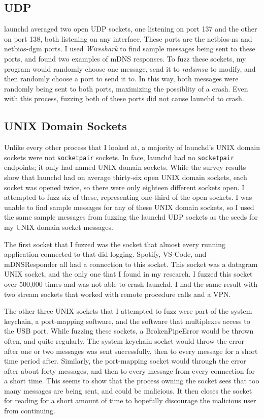 \subsection{UDP}
\label{sec:launchdUdp}
launchd averaged two open UDP sockets, one listening on port 137 and the other on port 138, both listening on any interface.  These ports are the netbios-ns and netbios-dgm ports.  I used \textit{Wireshark} to find sample messages being sent to these ports, and found two examples of mDNS responses.  To fuzz these sockets, my program would randomly choose one message, send it to \textit{radamsa} to modify, and then randomly choose a port to send it to.  In this way, both messages were randomly being sent to both ports, maximizing the possiblity of a crash.  Even with this process, fuzzing both of these ports did not cause launchd to crash.

\subsection{UNIX Domain Sockets}
\label{sec:launchdUnix}
Unlike every other process that I looked at, a majority of launchd's UNIX domain sockets were not \texttt{socketpair} sockets.  In face, launchd had no \texttt{socketpair} endpoints; it only had named UNIX domain sockets.  While the survey results show that launchd had on average thirty-six open UNIX domain sockets, each socket was opened twice, so there were only eighteen different sockets open.  I attempted to fuzz six of these, representing one-third of the open sockets.  I was unable to find sample messages for any of these UNIX domain sockets, so I used the same sample messages from fuzzing the launchd UDP sockets as the seeds for my UNIX domain socket messages.

The first socket that I fuzzed was the socket that almost every running application connected to that did logging.  Spotify, VS Code, and mDNSResponder all had a connection to this socket.  This socket was a datagram UNIX socket, and the only one that I found in my research.  I fuzzed this socket over 500,000 times and was not able to crash launchd.  I had the same result with two stream sockets that worked with remote procedure calls and a VPN.

The other three UNIX sockets that I attempted to fuzz were part of the system keychain, a port-mapping software, and the software that multiplexes access to the USB port.  While fuzzing these sockets, a BrokenPipeError would be thrown often, and quite regularly.  The system keychain socket would throw the error after one or two messages was sent successfully, then to every message for a short time period after.  Similarly, the port-mapping socket would through the error after about forty messages, and then to every message from every connection for a short time.  This seems to show that the process owning the socket sees that too many messages are being sent, and could be malicious.  It then closes the socket for reading for a short amount of time to hopefully discourage the malicious user from continuing.

